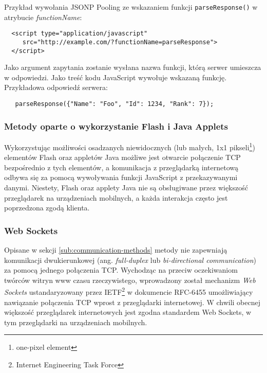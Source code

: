 \begin{description}
  Przykład wywołania JSONP Pooling ze wskazaniem funkcji \lstinline{parseResponse()} w atrybucie \emph{functionName}:
\lstset{language=HTML}
\begin{lstlisting}
  <script type="application/javascript"
     src="http://example.com/?functionName=parseResponse">
  </script>
\end{lstlisting}
  
  Jako argument zapytania zostanie wysłana nazwa funkcji, którą serwer umieszcza w odpowiedzi. Jako treść kodu JavaScript wywołuje wskazaną funkcję. Przykładowa odpowiedź serwera:

\lstset{language=JavaScript}
\begin{lstlisting}
   parseResponse({"Name": "Foo", "Id": 1234, "Rank": 7});
\end{lstlisting}

\end{description}

\subsubsection{Metody oparte o wykorzystanie Flash i Java Applets}

Wykorzystując możliwości osadzanych niewidocznych (lub małych, 1x1 pikseli\footnote{one-pixel element}) elementów Flash oraz appletów Java możliwe jest otwarcie połączenie TCP bezpośrednio z tych elementów, a komunikacja z przeglądarką internetową odbywa się za pomocą wywoływania funkcji JavaScript z przekazywanymi danymi. Niestety, Flash oraz applety Java nie są obsługiwane przez większość przeglądarek na urządzeniach mobilnych, a każda interakcja często jest poprzedzona zgodą klienta.

\subsubsection{Web Sockets}
\label{subsub:websockets}

Opisane w sekcji \ref{sub:communication-methods} metody nie zapewniają komunikacji dwukierunkowej (ang. \emph{full-duplex} lub \emph{bi-directional communication}) za pomocą jednego połączenia TCP. Wychodząc na przeciw oczekiwaniom twórców witryn www czasu rzeczywistego, wprowadzony został mechanizm \emph{Web Sockets} ustandaryzowany przez IETF\footnote{Internet Engineering Task Force} w dokumencie RFC-6455\cite{websockets-rfc} umożliwiający nawiązanie połączenia TCP wprost z przeglądarki internetowej. W chwili obecnej większość przeglądarek internetowych jest zgodna standardem Web Sockets\cite{caniuse-websockets}, w tym przeglądarki na urządzeniach mobilnych.

